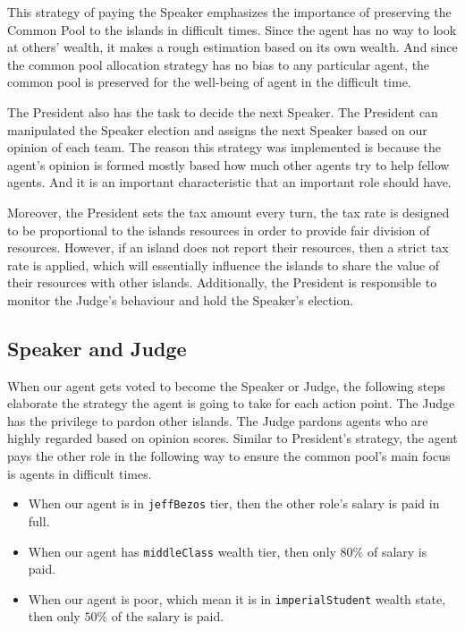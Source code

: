 This strategy of paying the Speaker emphasizes the importance of preserving the Common Pool to the islands in difficult times. Since the agent has no way to look at others' wealth, it makes a rough estimation based on its own wealth. And since the common pool allocation strategy has no bias to any particular agent, the common pool is preserved for the well-being of agent in the difficult time. 

The President also has the task to decide the next Speaker. The President can manipulated the Speaker election and assigns the next Speaker based on our opinion of each team. The reason this strategy was implemented is because the agent's opinion is formed mostly based how much other agents try to help fellow agents. And it is an important characteristic that an important role should have.    

Moreover, the President sets the tax amount every turn, the tax rate is designed to be proportional to the islands resources in order to provide fair division of resources. However, if an island does not report their resources, then a strict tax rate is applied, which will essentially influence the islands to share the value of their resources with other islands. Additionally, the President is responsible to monitor the Judge's behaviour and hold the Speaker's election. 

\subsection{Speaker and Judge}
When our agent gets voted to become the Speaker or Judge, the following steps elaborate the strategy the agent is going to take for each action point.
The Judge has the privilege to pardon other islands. The Judge pardons agents who are highly regarded based on opinion scores. Similar to President's strategy, the agent pays the other role in the following way  to ensure the common pool's main focus is agents in difficult times. 

    \begin{itemize}
        \item When our agent is in \texttt{jeffBezos} tier, then the other role's salary is paid in full.
        \item When our agent has \texttt{middleClass} wealth tier, then only $80\%$ of salary is paid.
        \item When our agent is poor, which mean it is in \texttt{imperialStudent} wealth state, then only $50\%$ of the salary is paid.
    \end{itemize}
    
